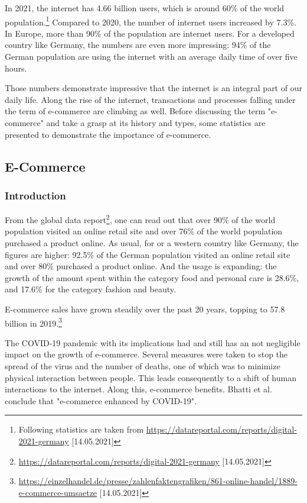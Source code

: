 In 2021, the internet has 4.66 billion users, which is around 60\% of the world population.\footnote{Following statistics are taken from \url{https://datareportal.com/reports/digital-2021-germany} [14.05.2021]}
Compared to 2020, the number of internet users increased by 7.3\%.
In Europe, more than 90\% of the population are internet users.
For a developed country like Germany, the numbers are even more impressing:
94\% of the German population are using the internet with an average daily time of over five hours.

Those numbers demonstrate impressive that the internet is an integral part of our daily life.
Along the rise of the internet, transactions and processes falling under the term of e-commerce are climbing as well.
Before discussing the term "e-commerce" and take a grasp at its history and types, some statistics are presented to demonstrate the importance of e-commerce.


\subsection{E-Commerce}
\label{chapter:ecommerce_subchapter}


\subsubsection{Introduction}

From the global data report\footnote{\url{https://datareportal.com/reports/digital-2021-germany} [14.05.2021]}, one can read out that over 90\% of the world population visited an online retail site and over 76\% of the world population purchased a product online.
As usual, for or a western country like Germany, the figures are higher:
92.5\% of the German population visited an online retail site and over 80\% purchased a product online.
And the usage is expanding: the growth of the amount spent within the category food and personal care is 28.6\%, and 17.6\% for the category fashion and beauty.

E-commerce sales have grown steadily over the past 20 years, topping to 57.8 billion in 2019.\footnote{\url{https://einzelhandel.de/presse/zahlenfaktengrafiken/861-online-handel/1889-e-commerce-umsaetze} [14.05.2021]}

The COVID-19 pandemic with its implications had and still has an not negligible impact on the growth of e-commerce.
Several measures were taken to stop the spread of the virus and the number of deaths, one of which was to minimize physical interaction between people.
This leads consequently to a shift of human interactions to the internet.
Along this, e-commerce benefits.
Bhatti et al. \cite{2020Bhatti} conclude that "e-commerce enhanced by COVID-19".



